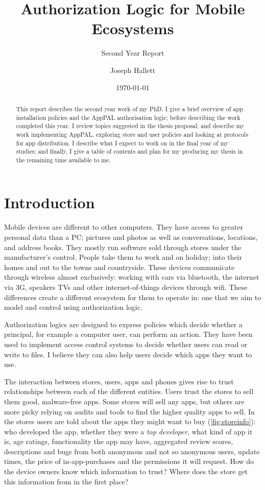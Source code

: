 \documentclass[a4paper]{scrartcl}
\title{Authorization Logic for Mobile Ecosystems}
\subtitle{Second Year Report}
\author{Joseph Hallett}
\date\today
\begin{document}
\maketitle

\begin{abstract}
  This report describes the second year work of my PhD.
  I give a brief overview of app installation policies and the AppPAL authorisation logic; before describing the work completed this year.
  I review topics suggested in the thesis proposal; and describe my work implementing AppPAL, exploring store and user policies and looking at protocols for app distribution.
  I describe what I expect to work on in the final year of my studies; and finally, I give a table of contents and plan for my producing my thesis in the remaining time available to me.
\end{abstract}

\section{Introduction}

Mobile devices are different to other computers.
They have access to greater personal data than a PC; pictures and photos as well as conversations, locations, and address books.
They mostly run software sold through stores under the manufacturer's control.
People take them to work and on holiday; into their homes and out to the towns and countryside.
These devices communicate through wireless almost exclusively: working with cars via bluetooth, the internet via 3G, speakers TVs and other internet-of-things devices through wifi.
These differences create a different ecosystem for them to operate in: one that we aim to model and control using authorization logic.

Authorization logics are designed to express policies which decide whether a principal, for example a computer user, can perform an action.
They have been used to implement access control systems to decide whether users can read or write to files.
I believe they can also help users decide which apps they want to use.

The interaction between stores, users, apps and phones gives rise to trust relationships between each of the different entities.
Users trust the stores to sell them good, malware-free apps.
Some stores will sell any apps, but others are more picky relying on audits and tools to find the higher quality apps to sell.
In the stores users are told about the apps they might want to buy (\autoref{fig:storeinfo}):
who developed the app, whether they were a \emph{top developer}, what kind of app it is, age ratings, functionality the app may have, aggregated review scores, descriptions and bugs from both anonymous and not so anonymous users, update times, the price of in-app-purchases and the permissions it will request.
How do the device owners know which information to trust?
Where does the store get this information from in the first place?
\end{document}
